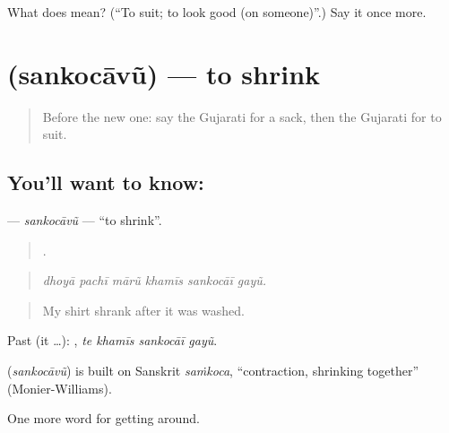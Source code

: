 \begin{tcolorbox}[breakable,colback=teal!4,colframe=teal!35!black,title={Before you move on}]
What does  mean? (\textquotedblleft{}To suit; to look good (on someone)\textquotedblright{}.) Say it once more.
\end{tcolorbox}
\section[\texorpdfstring{\gu{સંકોચાવું} (sankocāvũ)}{સંકોચાવું (sankocāvũ)}]{ (sankocāvũ) — to shrink}

\label{lesson:GU-C433-sankocavu}



\begin{quote}
Before the new one: say the Gujarati for a sack, then the Gujarati for to suit.
\end{quote}

\subsection*{You'll want to know: }
\textbf{} — \emph{sankocāvũ} — \textquotedblleft{}to shrink\textquotedblright{}.

\begin{quote}
     .
\end{quote}

\begin{quote}
\emph{dhoyā pachī mārũ khamīs sankocāī gayũ.}
\end{quote}

\begin{quote}
My shirt shrank after it was washed.
\end{quote}

Past (it …):    , \emph{te khamīs sankocāī gayũ}.

\begin{cousinweb}
\textbf{} (\emph{sankocāvũ}) is built on Sanskrit \emph{saṁkoca}, \textquotedblleft{}contraction, shrinking together\textquotedblright{} (Monier-Williams).
\end{cousinweb}

\begin{grammarlens}[title={What you've built}]
One more word for getting around.
\end{grammarlens}

